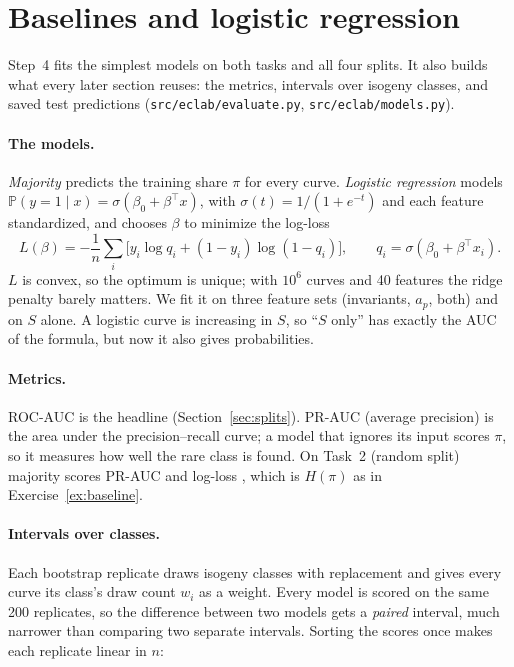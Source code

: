 \documentclass[11pt]{article}
\theoremstyle{definition}
\theoremstyle{plain}
\theoremstyle{remark}
\renewcommand{\P}{\mathbb{P}}
\renewcommand{\_}{\oldunderscore\allowbreak}
\newcommand{\file}[1]{\textcolor{blue!50!black}{\texttt{#1}}}
\begin{document}
\section{Baselines and logistic regression}
\label{sec:baselines}

Step~4 fits the simplest models on both tasks and all four splits. It also builds what every
later section reuses: the metrics, intervals over isogeny classes, and saved test predictions
(\file{src/eclab/evaluate.py}, \file{src/eclab/models.py}).

\paragraph{The models.}
\emph{Majority} predicts the training share $\pi$ for every curve. \emph{Logistic regression}
models $\P(y=1\mid x)=\sigma(\beta_0+\beta^\top x)$, with $\sigma(t)=1/(1+e^{-t})$ and each feature
standardized, and chooses $\beta$ to minimize the log-loss
\[
  L(\beta)=-\frac1n\sum_{i}\bigl[y_i\log q_i+(1-y_i)\log(1-q_i)\bigr],\qquad q_i=\sigma(\beta_0+\beta^\top x_i).
\]
$L$ is convex, so the optimum is unique; with $10^6$ curves and 40 features the ridge penalty
barely matters. We fit it on three feature sets (invariants, $a_p$, both) and on $S$ alone.
A logistic curve is increasing in $S$, so ``$S$ only'' has exactly the AUC of the formula,
but now it also gives probabilities.

\paragraph{Metrics.}
ROC-AUC is the headline (Section~\ref{sec:splits}). PR-AUC (average precision) is the area under
the precision--recall curve; a model that ignores its input scores $\pi$, so it measures how
well the rare class is found. On Task~2 (random split) majority scores PR-AUC \MajPrAuc{} and
log-loss \MajLogLoss, which is $H(\pi)$ as in Exercise~\ref{ex:baseline}.

\paragraph{Intervals over classes.}
Each bootstrap replicate draws isogeny classes with replacement and gives every curve its
class's draw count $w_i$ as a weight. Every model is scored on the same 200 replicates, so the
difference between two models gets a \emph{paired} interval, much narrower than comparing two
separate intervals. Sorting the scores once makes each replicate linear in $n$:
\end{document}
